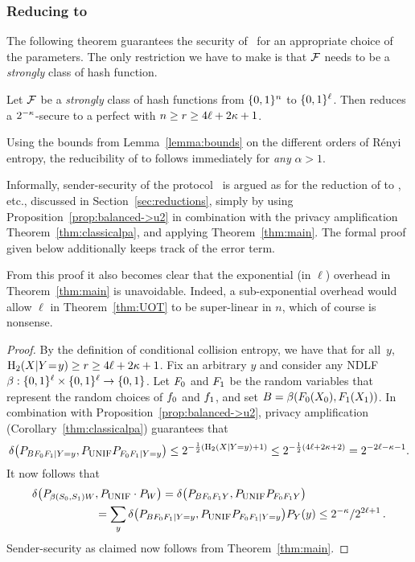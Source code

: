 \subsubsection{Reducing \lStringOT to \pUOT}

The following theorem guarantees the security of \OTUOT\ for an
appropriate choice of the parameters. The only restriction we have to
make is that $\UH$ needs to be a {\em strongly} \univ class of hash
function.

\begin{theorem}\label{thm:UOT}
  Let $\UH$ be a {\em strongly} \univ class of hash functions from
  $\set{0,1}^n$ to $\set{0,1}^{\ell}$. Then \OTUOT reduces a
  $2^{-\sp}$-secure \RandlStringOT to a perfect
   with $n \geq r \geq 4 \ell + 2 \sp + 1$.
\end{theorem}
Using the bounds from Lemma~\ref{lemma:bounds} on the different orders
of R\'enyi entropy, the reducibility of \lStringOT to
 follows immediately for {\em any} $\alpha > 1$.

Informally, sender-security of the protocol \OTUOT\ is argued as for
the reduction of \OT to \RabinOT, \XOT etc., discussed in
Section~\ref{sec:reductions}, simply by using
Proposition~\ref{prop:balanced->u2} in combination with the privacy
amplification Theorem~\ref{thm:classicalpa}, and applying
Theorem~\ref{thm:main}.  The formal proof given below additionally
keeps track of the error term.

From this proof it also becomes clear that the exponential (in $\ell$)
overhead in Theorem~\ref{thm:main} is unavoidable. Indeed, a
sub-exponential overhead would allow $\ell$ in Theorem~\ref{thm:UOT}
to be super-linear in $n$, which of course is nonsense.

\begin{proof}
  By the definition of conditional collision entropy, we have that for
  all~$y$,
$\H_2(X|Y\=y) \geq r \geq 4 \ell + 2\sp +1$. Fix
  an arbitrary $y$ and consider any NDLF 
  $\bal:\set{0,1}^{\ell}\times\set{0,1}^{\ell}\rightarrow\set{0,1}$.
  Let $\Hf_0$ and $\Hf_1$ be the random variables that represent the
  random choices of $\hf_0$ and $\hf_1$, and set $B =
  \bal(\Hf_0(X_0),\Hf_1(X_1))$. In combination with
  Proposition~\ref{prop:balanced->u2}, privacy amplification
  (Corollary~\ref{thm:classicalpa}) guarantees that
$$
\dist{P_{B \Hf_0 \Hf_1|Y=y}, P_{\unif} P_{\Hf_0 \Hf_1|Y=y}} \leq
2^{-\frac12(\H_2(X|Y=y)+1)} \leq 2^{-\frac12(4\ell+2\sp+2)} =
2^{-2\ell-\sp-1}.
$$
It now follows that
\begin{align*}
  \dist{ P_{\bal(S_0,S_1) W} &, P_{\unif} \cdot P_{W} } = \dist{P_{B \Hf_0 \Hf_1 Y},P_{\unif} P_{\Hf_0 \Hf_1 Y}} \\
  &= \sum_y \dist{P_{B \Hf_0 \Hf_1|Y=y},P_{\unif} P_{\Hf_0 \Hf_1|Y=y}}
  P_Y(y) \leq 2^{-\sp} / 2^{2\ell+1} \, .
\end{align*}
Sender-security as claimed now follows from Theorem~\ref{thm:main}.
\end{proof}

